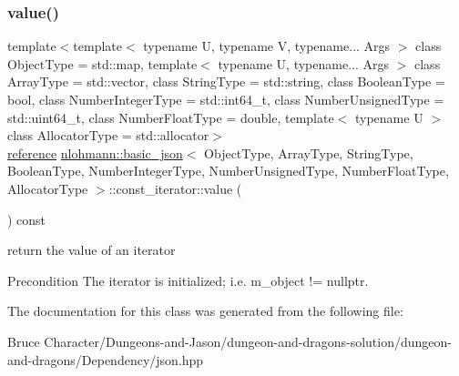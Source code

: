\subsubsection{\texorpdfstring{value()}{value()}}
{\footnotesize\ttfamily template$<$template$<$ typename U, typename V, typename... Args $>$ class Object\+Type = std\+::map, template$<$ typename U, typename... Args $>$ class Array\+Type = std\+::vector, class String\+Type  = std\+::string, class Boolean\+Type  = bool, class Number\+Integer\+Type  = std\+::int64\+\_\+t, class Number\+Unsigned\+Type  = std\+::uint64\+\_\+t, class Number\+Float\+Type  = double, template$<$ typename U $>$ class Allocator\+Type = std\+::allocator$>$ \\
\hyperlink{classnlohmann_1_1basic__json_1_1const__iterator_aefd248cac6493eed1e6ff53ba6a63eb2}{reference} \hyperlink{classnlohmann_1_1basic__json}{nlohmann\+::basic\+\_\+json}$<$ Object\+Type, Array\+Type, String\+Type, Boolean\+Type, Number\+Integer\+Type, Number\+Unsigned\+Type, Number\+Float\+Type, Allocator\+Type $>$\+::const\+\_\+iterator\+::value (\begin{DoxyParamCaption}{ }\end{DoxyParamCaption}) const\hspace{0.3cm}{\ttfamily [inline]}}



return the value of an iterator 

\begin{DoxyPrecond}{Precondition}
The iterator is initialized; i.\+e. {\ttfamily m\+\_\+object != nullptr}. 
\end{DoxyPrecond}


The documentation for this class was generated from the following file\+:\begin{DoxyCompactItemize}
\item 
Bruce Character/\+Dungeons-\/and-\/\+Jason/dungeon-\/and-\/dragons-\/solution/dungeon-\/and-\/dragons/\+Dependency/json.\+hpp\end{DoxyCompactItemize}
